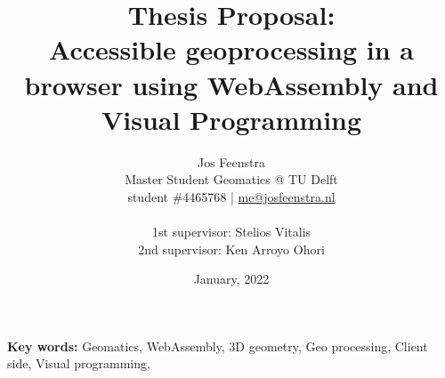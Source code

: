 \documentclass[a4paper,10pt]{scrartcl}
\title{Thesis Proposal: \\
Accessible geoprocessing in a browser using WebAssembly and Visual Programming
}
\author{
  Jos Feenstra\\
  Master Student Geomatics @ TU Delft\\
  student \#4465768 | \url{me@josfeenstra.nl}\\
  \\
  1st supervisor: Stelios Vitalis \\
  2nd supervisor: Ken Arroyo Ohori \\
}
\date{January, 2022}
\begin{document}
  
\clearpage\maketitle
\thispagestyle{empty}
\sffamily

\begin{center}
  \textbf{Key words:} Geomatics, WebAssembly, 3D geometry, Geo processing, Client side, Visual programming, 
\end{center}

\newpage
\printacronyms

\newpage
\tableofcontents

\newpage

\newpage

\newpage

\newpage

\newpage

\newpage


\newpage




\end{document}
